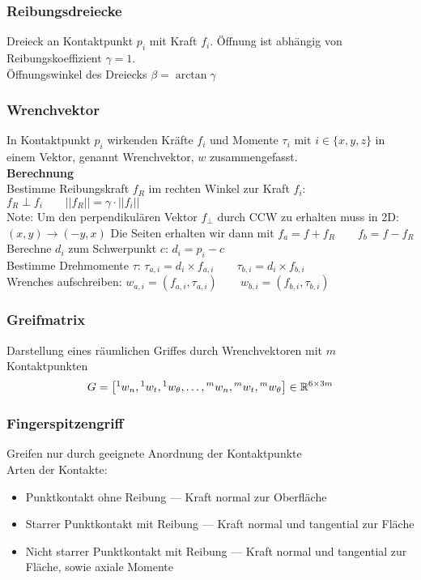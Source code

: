 \subsubsection{Reibungsdreiecke}
Dreieck an Kontaktpunkt \(p_i\) mit Kraft \(f_i\). Öffnung ist abhängig von Reibungskoeffizient \(\gamma = 1\).\\
Öffnungswinkel des Dreiecks \(\beta = \arctan \gamma\)

\subsubsection{Wrenchvektor}
In Kontaktpunkt \(p_i\) wirkenden Kräfte \(f_i\) und Momente \(\tau_i\) mit \(i \in \{x, y, z\}\) in einem Vektor,
genannt Wrenchvektor, \(w\) zusammengefasst.\\

\textbf{Berechnung}\\
Bestimme Reibungskraft \(f_R\) im rechten Winkel zur Kraft \(f_i\): \(f_R \perp f_i \qquad ||f_R|| = \gamma \cdot ||f_i||\)\\
Note: Um den perpendikulären Vektor \(f_{\perp}\) durch CCW zu erhalten muss in 2D: \((x, y) \rightarrow (-y, x)\)
Die Seiten erhalten wir dann mit \(f_a = f + f_R \qquad f_b = f - f_R\)\\
Berechne \(d_i\) zum Schwerpunkt \(c\): \(d_i = p_i - c\)\\
Bestimme Drehmomente \(\tau\): \(\tau_{a,i} = d_i \times f_{a,i} \qquad \tau_{b,i} = d_i \times f_{b,i}\)\\
Wrenches aufschreiben: \(w_{a,i} = (f_{a,i}, \tau_{a,i}) \qquad w_{b,i} = (f_{b,i}, \tau_{b, i})\)\\
\subsubsection{Greifmatrix}
Darstellung eines räumlichen Griffes durch Wrenchvektoren mit \(m\) Kontaktpunkten
\[G = \left[ {}^1w_n, {}^1w_t, {}^1w_{\theta}, \ldots, {}^mw_n, {}^mw_t, {}^mw_{\theta}\right] \in \mathbb{R}^{6\times3m}\]

\subsubsection{Fingerspitzengriff}
Greifen nur durch geeignete Anordnung der Kontaktpunkte\\
Arten der Kontakte:
\begin{itemize}
\item Punktkontakt ohne Reibung --- Kraft normal zur Oberfläche
\item Starrer Punktkontakt mit Reibung --- Kraft normal und tangential zur Fläche
\item Nicht starrer Punktkontakt mit Reibung --- Kraft normal und tangential zur Fläche, sowie axiale Momente
\end{itemize}


